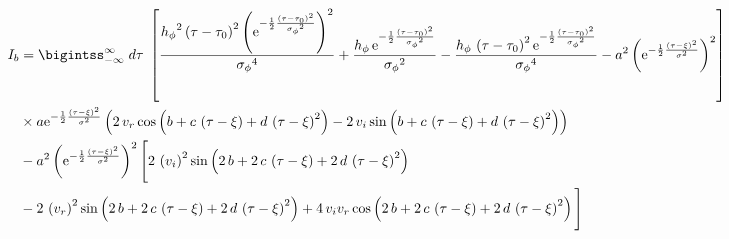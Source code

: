 \begin{landscape}
\begin{align}
I_b & = \bigintss_{-\infty}^{\infty} \; d\tau\; \left[ \frac{{{ h_{\phi}}}^{2} \left( \tau-{ \tau_0} \right) ^{2} \left( {
{\rm e}^{-\frac{1}{2}{\frac { \left( \tau-{ \tau_0} \right) ^{2}}{{{ 
\sigma_{\phi}}}^{2}}}}} \right) ^{2}}{{{ \sigma_{\phi}}}^{4}}+\frac{{ h_{\phi}}
\,{{\rm e}^{-\frac{1}{2}{\frac { \left( \tau-{ \tau_0} \right) ^{2}}{{{ 
\sigma_{\phi}}}^{2}}}}}}{{{ \sigma_{\phi}}}^{2}}-\frac{{ h_{\phi}}\, \left( \tau-{
 \tau_0} \right) ^{2}{{\rm e}^{-\frac{1}{2}{\frac { \left( \tau-{ \tau_0}
 \right) ^{2}}{{{ \sigma_{\phi}}}^{2}}}}}}{{{ \sigma_{\phi}}}^{4}}-{a}^{
2} \left( {{\rm e}^{-\frac{1}{2}{\frac { \left( \tau-\xi \right) ^{2}}{{
\sigma}^{2}}}}} \right) ^{2} \right] \nonumber \\
& \times a{{\rm e}^{-\frac{1}{2}{\frac { \left( 
\tau-\xi \right) ^{2}}{{\sigma}^{2}}}}} \left( 2\, v_r \cos \left( b+c\, \left( \tau-\xi \right) +d\,
 \left( \tau-\xi \right) ^{2} \right) -2\,v_i \sin \left( b+c\, \left( \tau-\xi \right) +d\, \left( \tau-{
 \xi} \right) ^{2} \right)  \right) \nonumber \\
 & -{a}^{2} \left( {{\rm e}^{-\frac{1}{2}
{\frac { \left( \tau-\xi \right) ^{2}}{{\sigma}^{2}}}}} \right) ^{2}
 \Bigg[ 2\, \left( v_i  \right) ^{2}
\sin \left( 2\,b+2\,c\, \left( \tau-\xi \right) +2\,d\, \left( \tau-{
 \xi} \right) ^{2} \right) \nonumber \\
 &-2\, \left( v_r  \right) ^{2}\sin \left( 2\,b+2\,c\, \left( \tau-\xi
 \right) +2\,d\, \left( \tau-\xi \right) ^{2} \right) +4\,v_i v_r\cos
 \left( 2\,b+2\,c\, \left( \tau-\xi \right) +2\,d\, \left( \tau-{ \xi
} \right) ^{2} \right)  \Bigg]
\end{align}


\end{landscape}
